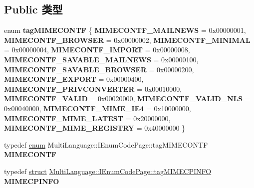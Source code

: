 \subsection*{Public 类型}
\begin{DoxyCompactItemize}
\item 
\mbox{\label{interface_multi_language_1_1_i_enum_code_page_ad203d654aa0efc874ac885edb57fde5e}} 
enum {\bfseries tag\+M\+I\+M\+E\+C\+O\+N\+TF} \{ \newline
{\bfseries M\+I\+M\+E\+C\+O\+N\+T\+F\+\_\+\+M\+A\+I\+L\+N\+E\+WS} = 0x00000001, 
{\bfseries M\+I\+M\+E\+C\+O\+N\+T\+F\+\_\+\+B\+R\+O\+W\+S\+ER} = 0x00000002, 
{\bfseries M\+I\+M\+E\+C\+O\+N\+T\+F\+\_\+\+M\+I\+N\+I\+M\+AL} = 0x00000004, 
{\bfseries M\+I\+M\+E\+C\+O\+N\+T\+F\+\_\+\+I\+M\+P\+O\+RT} = 0x00000008, 
\newline
{\bfseries M\+I\+M\+E\+C\+O\+N\+T\+F\+\_\+\+S\+A\+V\+A\+B\+L\+E\+\_\+\+M\+A\+I\+L\+N\+E\+WS} = 0x00000100, 
{\bfseries M\+I\+M\+E\+C\+O\+N\+T\+F\+\_\+\+S\+A\+V\+A\+B\+L\+E\+\_\+\+B\+R\+O\+W\+S\+ER} = 0x00000200, 
{\bfseries M\+I\+M\+E\+C\+O\+N\+T\+F\+\_\+\+E\+X\+P\+O\+RT} = 0x00000400, 
{\bfseries M\+I\+M\+E\+C\+O\+N\+T\+F\+\_\+\+P\+R\+I\+V\+C\+O\+N\+V\+E\+R\+T\+ER} = 0x00010000, 
\newline
{\bfseries M\+I\+M\+E\+C\+O\+N\+T\+F\+\_\+\+V\+A\+L\+ID} = 0x00020000, 
{\bfseries M\+I\+M\+E\+C\+O\+N\+T\+F\+\_\+\+V\+A\+L\+I\+D\+\_\+\+N\+LS} = 0x00040000, 
{\bfseries M\+I\+M\+E\+C\+O\+N\+T\+F\+\_\+\+M\+I\+M\+E\+\_\+\+I\+E4} = 0x10000000, 
{\bfseries M\+I\+M\+E\+C\+O\+N\+T\+F\+\_\+\+M\+I\+M\+E\+\_\+\+L\+A\+T\+E\+ST} = 0x20000000, 
\newline
{\bfseries M\+I\+M\+E\+C\+O\+N\+T\+F\+\_\+\+M\+I\+M\+E\+\_\+\+R\+E\+G\+I\+S\+T\+RY} = 0x40000000
 \}
\item 
\mbox{\label{interface_multi_language_1_1_i_enum_code_page_ac564542711bb16b73c0d53f66ced2b66}} 
typedef \hyperlink{interfaceenum}{enum} Multi\+Language\+::\+I\+Enum\+Code\+Page\+::tag\+M\+I\+M\+E\+C\+O\+N\+TF {\bfseries M\+I\+M\+E\+C\+O\+N\+TF}
\item 
\mbox{\label{interface_multi_language_1_1_i_enum_code_page_a40928f5ff8ba5b37dc743131a5c3844d}} 
typedef \hyperlink{interfacestruct}{struct} \hyperlink{struct_multi_language_1_1_i_enum_code_page_1_1tag_m_i_m_e_c_p_i_n_f_o}{Multi\+Language\+::\+I\+Enum\+Code\+Page\+::tag\+M\+I\+M\+E\+C\+P\+I\+N\+FO} {\bfseries M\+I\+M\+E\+C\+P\+I\+N\+FO}

\end{DoxyCompactItemize}
